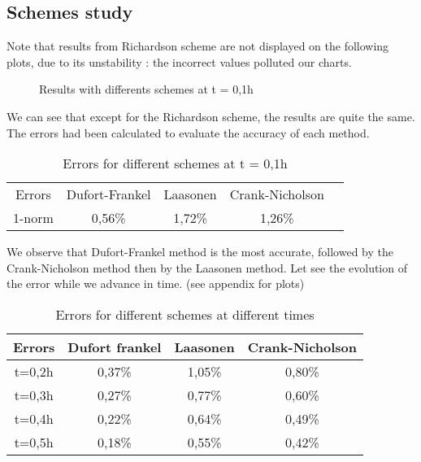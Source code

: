 \documentclass{article}
\begin{document}
            \subsection{Schemes study}
                Note that results from Richardson scheme are not displayed on the following plots, due to its unstability \cite{rich}: 
            the incorrect values polluted our charts.
            \begin{figure}[H]
                \caption{Results with differents schemes at t = 0,1h}
            \end{figure}
            We can see that except for the Richardson scheme, the results are quite the same. The errors had been calculated 
            to evaluate the accuracy of each method.
            \begin{table}[H]
                \centering
                \caption{Errors for different schemes at t = 0,1h}
                \begin{tabular}{|c|c|c|c|l}
                \cline{1-4}
                Errors & Dufort-Frankel & Laasonen & Crank-Nicholson &  \\ \cline{1-4}
                1-norm & 0,56\%         & 1,72\%   & 1,26\%          &  \\ \cline{1-4}
                \end{tabular}
            \end{table}
            We observe that Dufort-Frankel method is the most accurate, 
            followed by the Crank-Nicholson method then by the Laasonen method. Let see the evolution of the error
            while we advance in time. (see appendix for plots)
            
            \begin{table}[H]
                \centering
                \caption{Errors for different schemes at different times}
                \begin{tabular}{|c|c|c|c|}
                \hline
                Errors & Dufort frankel & Laasonen & Crank-Nicholson \\ \hline
                t=0,2h & 0,37\%         & 1,05\%   & 0,80\%          \\ \hline
                t=0,3h & 0,27\%         & 0,77\%   & 0,60\%          \\ \hline
                t=0,4h & 0,22\%         & 0,64\%   & 0,49\%          \\ \hline
                t=0,5h & 0,18\%         & 0,55\%   & 0,42\%          \\ \hline
                \end{tabular}
            \end{table}
    
\end{document}
